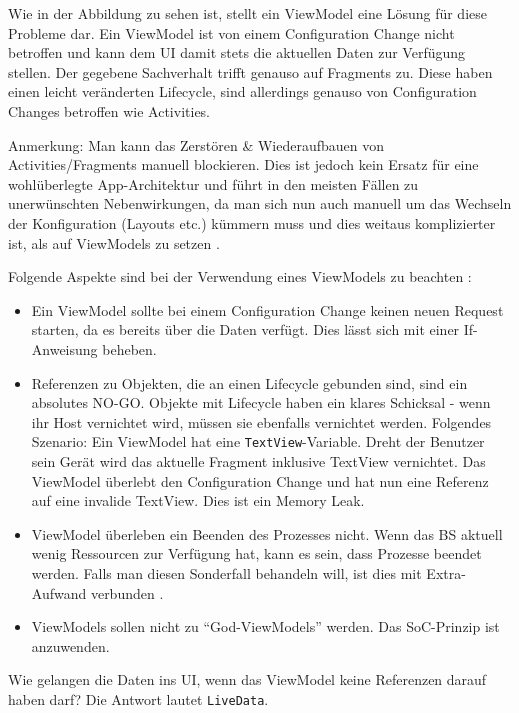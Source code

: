 Wie in der Abbildung zu sehen ist, stellt ein ViewModel eine Lösung für
diese Probleme dar. Ein ViewModel ist von einem Configuration Change
nicht betroffen und kann dem UI damit stets die aktuellen Daten zur
Verfügung stellen. Der gegebene Sachverhalt trifft genauso auf Fragments
zu. Diese haben einen leicht veränderten Lifecycle, sind allerdings
genauso von Configuration Changes betroffen wie Activities.

Anmerkung: Man kann das Zerstören \& Wiederaufbauen von
Activities/Fragments manuell blockieren. Dies ist jedoch kein Ersatz für
eine wohlüberlegte App-Architektur und führt in den meisten Fällen zu
unerwünschten Nebenwirkungen, da man sich nun auch manuell um das
Wechseln der Konfiguration (Layouts etc.) kümmern muss und dies weitaus
komplizierter ist, als auf ViewModels zu setzen
\cite{lifecycle-blocking}.

Folgende Aspekte sind bei der Verwendung eines ViewModels zu beachten
\cite{viewmodel-antipatterns}:

\begin{itemize}
\tightlist
\item
  Ein ViewModel sollte bei einem Configuration Change keinen neuen
  Request starten, da es bereits über die Daten verfügt. Dies lässt sich
  mit einer If-Anweisung beheben.
\item
  Referenzen zu Objekten, die an einen Lifecycle gebunden sind, sind ein
  absolutes NO-GO. Objekte mit Lifecycle haben ein klares Schicksal -
  wenn ihr Host vernichtet wird, müssen sie ebenfalls vernichtet werden.
  Folgendes Szenario: Ein ViewModel hat eine \texttt{TextView}-Variable.
  Dreht der Benutzer sein Gerät wird das aktuelle Fragment inklusive
  TextView vernichtet. Das ViewModel überlebt den Configuration Change
  und hat nun eine Referenz auf eine invalide TextView. Dies ist ein
  Memory Leak.
\item
  ViewModel überleben ein Beenden des Prozesses nicht. Wenn das BS
  aktuell wenig Ressourcen zur Verfügung hat, kann es sein, dass
  Prozesse beendet werden. Falls man diesen Sonderfall behandeln will,
  ist dies mit Extra-Aufwand verbunden \cite{viewmodel-process-death}.
\item
  ViewModels sollen nicht zu ``God-ViewModels'' werden. Das SoC-Prinzip
  ist anzuwenden.
\end{itemize}

Wie gelangen die Daten ins UI, wenn das ViewModel keine Referenzen
darauf haben darf? Die Antwort lautet \texttt{LiveData}.

